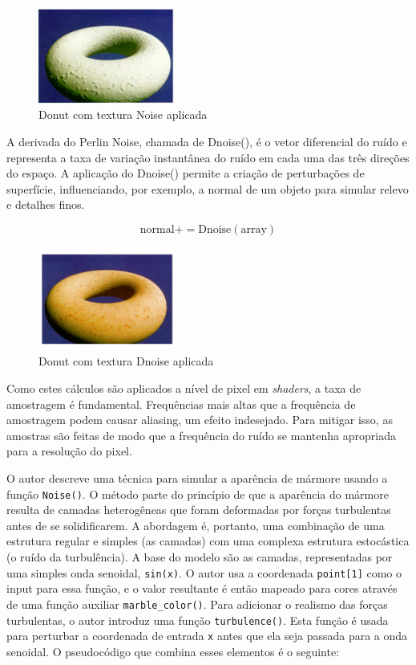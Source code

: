 \begin{figure}[H]
    \centering
    \includegraphics[width=0.4\textwidth]{img/donut3.png}
    \caption{Donut com textura Noise aplicada}
    \label{fig:cube_noise}
\end{figure}

A derivada do Perlin Noise, chamada de Dnoise(), é o vetor diferencial do ruído e representa a taxa de variação instantânea do ruído em cada uma das três direções do espaço. A aplicação do Dnoise() permite a criação de perturbações de superfície, influenciando, por exemplo, a normal de um objeto para simular relevo e detalhes finos.

$$
\text{normal} += \text{Dnoise}(\text{array})
$$

\begin{figure}[H]
    \centering
    \includegraphics[width=0.4\textwidth]{img/donut4.png}
    \caption{Donut com textura Dnoise aplicada}
    \label{fig:donut_dnoise}
\end{figure}

Como estes cálculos são aplicados a nível de pixel em \textit{shaders}, a taxa de amostragem é fundamental. Frequências mais altas que a frequência de amostragem podem causar aliasing, um efeito indesejado. Para mitigar isso, as amostras são feitas de modo que a frequência do ruído se mantenha apropriada para a resolução do pixel.

O autor descreve uma técnica para simular a aparência de mármore usando a função \texttt{Noise()}. O método parte do princípio de que a aparência do mármore resulta de camadas heterogêneas que foram deformadas por forças turbulentas antes de se solidificarem. A abordagem é, portanto, uma combinação de uma estrutura regular e simples (as camadas) com uma complexa estrutura estocástica (o ruído da turbulência). A base do modelo são as camadas, representadas por uma simples onda senoidal, \texttt{sin(x)}. O autor usa a coordenada \texttt{point[1]} como o input para essa função, e o valor resultante é então mapeado para cores através de uma função auxiliar \texttt{marble\_color()}. Para adicionar o realismo das forças turbulentas, o autor introduz uma função \texttt{turbulence()}. Esta função é usada para perturbar a coordenada de entrada \texttt{x} antes que ela seja passada para a onda senoidal. O pseudocódigo que combina esses elementos é o seguinte:

